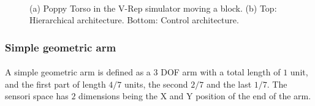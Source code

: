 \documentclass[12pt]{article}
\begin{document}
					
						

			\begin{figure}[H]
				\centering
				\\
				\caption{(a) Poppy Torso in the V-Rep simulator moving a block. (b) Top: Hierarchical architecture. Bottom: Control architecture.}
				\label{fig_sim}
			\end{figure}
			
		
		\subsubsection{Simple geometric arm}
		
			\paragraph{}
			A simple geometric arm is defined as a $3$ DOF arm with a total length of $1$ unit, and the first part of length $4/7$ units, the second $2/7$
			and the last $1/7$. The sensori space has $2$ dimensions being the X and Y position of the end of the arm.
			
\end{document}
